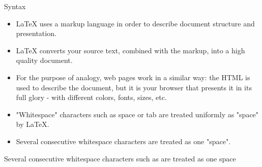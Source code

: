\documentclass[style=lsuloni,orient=landscape]{powerdot}
\begin{document}
\begin{wideslide}[bm={Syntax},method=file]{Syntax}
  \begin{itemize}
  \item LaTeX uses a markup language in order to describe document structure and presentation.
  \item LaTeX converts your source text, combined with the markup, into a high quality document.
  \item For the purpose of analogy, web pages work in a similar way: the HTML is used to describe the document, but it is your browser that presents it in its full glory - with different colors, fonts, sizes, etc.
  \item "Whitespace" characters such as space or tab are treated uniformly as "space" by LaTeX.
  \item Several consecutive whitespace characters are treated as one "space".
  \end{itemize}	
  \begin{LTXexample}[numbers=none,showspaces=true,pos=b]
Several consecutive whitespace characters such as          are treated as one space
  \end{LTXexample}
\end{wideslide}
\end{document}
